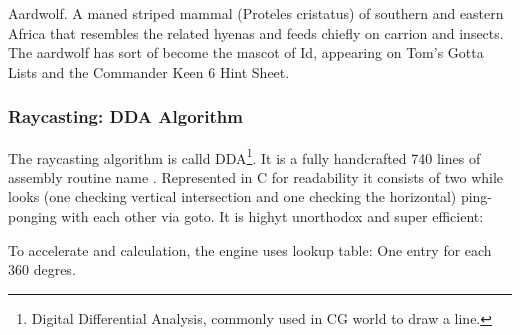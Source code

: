 \par
Aardwolf. A maned striped mammal (Proteles cristatus) of southern and eastern
Africa that resembles the related hyenas and feeds chiefly on carrion and insects.
The aardwolf has sort of become the mascot of Id, appearing on Tom's Gotta
Lists and the Commander Keen 6 Hint Sheet.














 
 
 
 
 
 
 
 
\subsubsection{Raycasting: DDA Algorithm}
The raycasting algorithm is calld DDA\footnote{Digital Differential Analysis, commonly used in CG world to draw a line.}. It is a fully handcrafted 740 lines of assembly routine name . Represented in C for readability it consists of two while looks (one checking vertical intersection and one checking the horizontal) ping-ponging with each other via goto. It is highyt unorthodox and super efficient:\\
\par

\begin{minipage}{\textwidth}

\end{minipage}

 To accelerate  and  calculation, the engine uses lookup table: One entry for each 360 degres.




